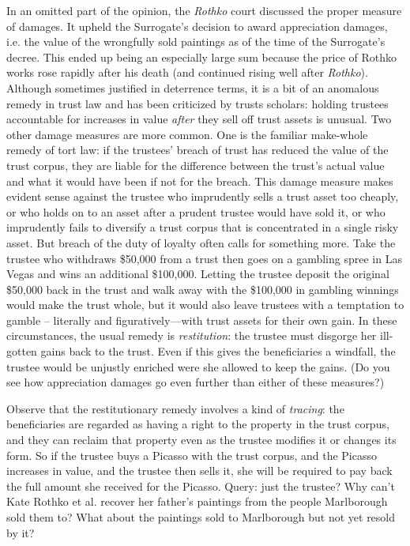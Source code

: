 \item In an omitted part of the opinion, the \textit{Rothko} court discussed the
proper measure of damages. It upheld the Surrogate's decision to award
appreciation damages, i.e. the value of the wrongfully sold paintings as of the
time of the Surrogate's decree. This ended up being an especially large sum
because the price of Rothko works rose rapidly after his death (and continued
rising well after \textit{Rothko}). Although sometimes justified in deterrence
terms, it is a bit of an anomalous remedy in trust law and has been criticized
by trusts scholars: holding trustees accountable for increases in value
\textit{after} they sell off trust assets is unusual. Two other damage measures
are more common. One is the familiar make-whole remedy of tort law: if the
trustees' breach of trust has reduced the value of the trust corpus, they are
liable for the difference between the trust's actual value and what it would
have been if not for the breach. This damage measure makes evident sense against
the trustee who imprudently sells a trust asset too cheaply, or who holds on to
an asset after a prudent trustee would have sold it, or who imprudently fails to
diversify a trust corpus that is concentrated in a single risky asset. But
breach of the duty of loyalty often calls for something more. Take the trustee
who withdraws \$50,000 from a trust then goes on a gambling spree in Las Vegas
and wins an additional \$100,000. Letting the trustee deposit the original
\$50,000 back in the trust and walk away with the \$100,000 in gambling winnings
would make the trust whole, but it would also leave trustees with a temptation
to gamble \-\--- literally and figuratively---with trust assets for their own
gain. In these circumstances, the usual remedy is \textit{restitution}: the
trustee must disgorge her ill-gotten gains back to the trust. Even if this gives
the beneficiaries a windfall, the trustee would be unjustly enriched were she
allowed to keep the gains. (Do you see how appreciation damages go even further
than either of these measures?) 


Observe that the restitutionary remedy involves a kind of \textit{tracing}: the
beneficiaries are regarded as having a right to the property in the trust
corpus, and they can reclaim that property even as the trustee modifies it or
changes its form. So if the trustee buys a Picasso with the trust corpus, and
the Picasso increases in value, and the trustee then sells it, she will be
required to pay back the full amount she received for the Picasso. Query: just
the trustee? Why can't Kate Rothko et al. recover her father's paintings from
the people Marlborough sold them to? What about the paintings sold to
Marlborough but not yet resold by it?



